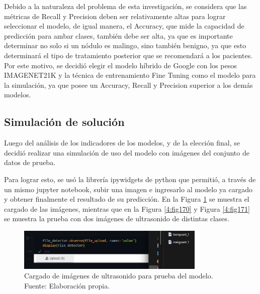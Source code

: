 Debido a la naturaleza del problema de esta investigación, se considera que las métricas de Recall y Precision deben ser relativamente altas para lograr seleccionar el modelo, de igual manera, el Accuracy, que mide la capacidad de predicción para ambar clases, también debe ser alta, ya que es importante determinar no solo si un nódulo es malingo, sino también benigno, ya que esto determinará el tipo de tratamiento posterior que se recomendará a los pacientes. Por este motivo, se decidió elegir el modelo híbrido de Google con los pesos IMAGENET21K y la técnica de entrenamiento Fine Tuning como el modelo para la simulación, ya que posee un Accuracy, Recall y Precision superior a los demás modelos.

\subsection{Simulación de solución}

Luego del análisis de los indicadores de los modelos, y de la elección final, se decidió realizar una simulación de uso del modelo con imágenes del conjunto de datos de prueba.

Para lograr esto, se usó la librería ipywidgets de python que permitió, a través de un mismo jupyter notebook, subir una imagen e ingresarlo al modelo ya cargado y obtener finalmente el resultado de su predicción. En la Figura \ref{4:fig174} se muestra el cargado de las imágenes, mientras que en la Figura \ref{4:fig170} y Figura \ref{4:fig171} se muestra la prueba con dos imágenes de ultrasonido de distintas clases.

\begin{figure}[H]
	\begin{center}
		\includegraphics[width=0.80\textwidth]{4/figures/upload_image.png}
		\caption[Cargado de imágenes de ultrasonido para prueba del modelo]{Cargado de imágenes de ultrasonido para prueba del modelo. \\
		Fuente: Elaboración propia.}
		\label{4:fig174}
	\end{center}
\end{figure}

